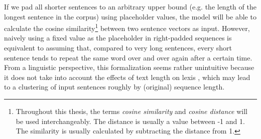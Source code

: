 \documentclass[oneside]{book}
\begin{document}
If we pad all shorter sentences to an arbitrary upper bound (e.g. the length of the longest sentence in the corpus) using placeholder values, the model will be able to calculate the cosine similarity\footnote{Throughout this thesis, the terms \textit{cosine similarity} and \textit{cosine distance} will be used interchangeably. The distance is usually a value between -1 and 1. The similarity is usually calculated by subtracting the distance from 1.} \parencite[3]{luoCosineNormalizationUsing2017} between two sentence vectors as input. However, naively using a fixed value as the placeholder in right-padded sequences \parencite[386]{sachanEffectiveUseBidirectional2018} is equivalent to assuming that, compared to very long sentences, every short sentence tends to repeat the same word over and over again after a certain time. From a linguistic perspective, this formalization seems rather unintuitive because it does not take into account the effects of text length on lexis \parencites[31]{golcherStylometryInterplayTopic2011}[141]{ochabStylometryLiteraryPapyri2019}, which may lead to a clustering of input sentences roughly by (original) sequence length.
\end{document}
